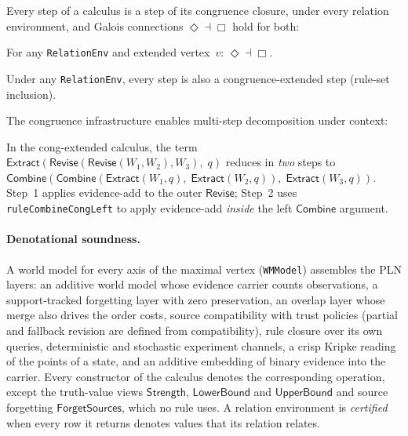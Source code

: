 \documentclass[11pt,openany]{report}
\begin{document}
Every step of a calculus is a step of its congruence closure, under every
relation environment, and Galois connections $\Diamond \dashv \Box$ hold for
both:

\begin{theorem}
For any \texttt{RelationEnv} and extended vertex~$v$: $\Diamond \dashv \Box$.
\end{theorem}

\begin{theorem}
Under any \texttt{RelationEnv}, every step is also a congruence-extended step
(rule-set inclusion).
\end{theorem}

The congruence infrastructure enables multi-step decomposition under context:

\begin{theorem}
In the cong-extended calculus, the term
$\mathsf{Extract}(\mathsf{Revise}(\mathsf{Revise}(W_1, W_2), W_3),\; q)$
reduces in \emph{two} steps to
$\mathsf{Combine}(\mathsf{Combine}(\mathsf{Extract}(W_1,q),\;
\mathsf{Extract}(W_2,q)),\; \mathsf{Extract}(W_3,q))$.
Step~1 applies evidence-add to the outer $\mathsf{Revise}$;
Step~2 uses \texttt{ruleCombineCongLeft} to apply evidence-add
\emph{inside} the left $\mathsf{Combine}$ argument.
\end{theorem}

\paragraph{Denotational soundness.}
A world model for every axis of the maximal vertex (\texttt{WMModel})
assembles the PLN layers: an additive world model whose evidence carrier
counts observations, a support-tracked forgetting layer with zero
preservation, an overlap layer whose merge also drives the order costs,
source compatibility with trust policies (partial and fallback revision are
defined from compatibility), rule closure over its own queries, deterministic
and stochastic experiment channels, a crisp Kripke reading of the points of a
state, and an additive embedding of binary evidence into the carrier.  Every
constructor of the calculus denotes the corresponding operation, except the
truth-value views $\mathsf{Strength}$, $\mathsf{LowerBound}$ and
$\mathsf{UpperBound}$ and source forgetting $\mathsf{ForgetSources}$, which
no rule uses.  A relation environment is \emph{certified} when every row it
returns denotes values that its relation relates.
\end{document}
